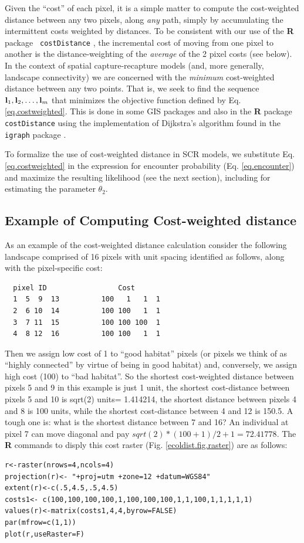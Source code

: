 \documentclass[12pt]{article}
\begin{document}
Given the ``cost'' of each pixel, it is a simple matter to compute the
cost-weighted distance between any two pixels, along {\it any} path,
simply by accumulating the intermittent costs weighted by distances.
To be consistent with our use of the {\bf R} package \mbox{\tt
  costDistance} \citep{vanetten:2011}, the incremental cost of moving
from one pixel to another is the distance-weighting of the {\it
  average} of the 2 pixel costs (see below).  In the context of
spatial capture-recapture models (and, more generally, landscape
connectivity) we are concerned with the {\it minimum} cost-weighted
distance between any two points.  That is, we seek to find the
sequence ${\bf l}_{1},{\bf l}_{2},\ldots,{\bf l}_{m}$ that minimizes
the objective function defined by Eq. \ref{eq.costweighted}.  This is
done in some GIS packages and also in the {\bf R} package \mbox{\tt
  costDistance} using the implementation of Dijkstra's algorithm
\citep{dijkstra:1959} found in the \mbox{\tt igraph} package
\citep{csardi:2010}.

To formalize the use of cost-weighted distance in SCR models, we
substitute Eq. \ref{eq.costweighted} in the expression for encounter
probability (Eq. \ref{eq.encounter}) and maximize the resulting
likelihood (see the next section), including for estimating the
parameter $\theta_{2}$.




\subsection{Example of Computing Cost-weighted distance}

As an example of the cost-weighted distance calculation consider the
following landscape comprised of 16 pixels with unit spacing
identified as follows, along with the pixel-specific cost:
\begin{verbatim}
  pixel ID                 Cost
  1  5  9  13          100   1   1  1
  2  6 10  14          100 100   1  1
  3  7 11  15          100 100 100  1
  4  8 12  16          100 100   1  1
\end{verbatim}
Then we assign low cost of 1 to ``good habitat'' pixels (or pixels we
think of as ``highly connected'' by virtue of being in good habitat)
and, conversely, we assign high cost (100) to ``bad habitat''. So the
shortest cost-weighted distance between pixels 5 and 9 in this example
is just 1 unit, the shortest cost-distance between pixels 5 and 10 is
sqrt(2) units= 1.414214, the shortest distance between pixels 4 and 8 is 100
units, while the shortest cost-distance between 4 and 12 is 150.5. A
tough one is: what is the shortest distance between 7 and 16? An
individual at pixel 7 can move diagonal and pay  $sqrt(2)*(100+1)/2 + 1 =72.41778$.
The {\bf R} commands to disply this cost raster
(Fig. \ref{ecoldist.fig.raster})  are as follows:
\begin{verbatim}
r<-raster(nrows=4,ncols=4)
projection(r)<- "+proj=utm +zone=12 +datum=WGS84"
extent(r)<-c(.5,4.5,.5,4.5)
costs1<- c(100,100,100,100,1,100,100,100,1,1,100,1,1,1,1,1)
values(r)<-matrix(costs1,4,4,byrow=FALSE)
par(mfrow=c(1,1))
plot(r,useRaster=F)
\end{verbatim}
\end{document}
